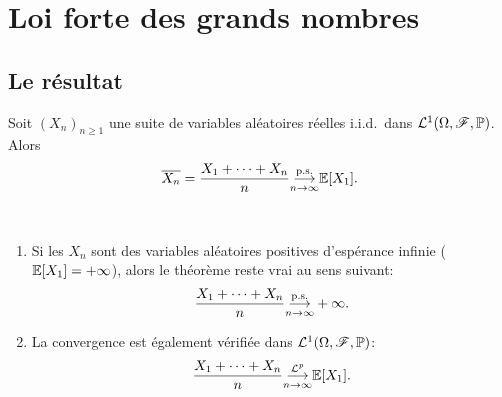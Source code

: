

\section{Loi forte des grands nombres} %

\subsection{Le résultat} %

\begin{theorem}
    Soit \({(X_n)}_{n\geq 1}\) une suite de variables aléatoires
    réelles i.i.d.\ dans \(\mathcal L^1(\Omega, \mathscr{F}, \mathbb{P})\).
    Alors
    \begin{equation*}
        \overline{X_n} = \frac{X_1 + \cdots + X_n}{n} \underset{n\to\infty}{{\overset{\text{p.s.}}{\longrightarrow}}} \mathbb{E}[X_1].
    \end{equation*}
\end{theorem}

\begin{remark}\,
    \begin{enumerate}
        \item Si les \(X_n\) sont des variables aléatoires
        positives d'espérance infinie (\(\mathbb{E}[X_1] = +\infty\)),
        alors le théorème reste vrai au sens suivant:
        \begin{equation*}
            \frac{X_1 + \cdots + X_n}{n} \underset{n\to\infty}{{\overset{\text{p.s.}}{\longrightarrow}}} +\infty.
        \end{equation*}

        \item La convergence est également vérifiée dans
        \(\mathcal L^1(\Omega, \mathscr{F}, \mathbb{P})\):
        \begin{equation*}
            \frac{X_1 + \cdots + X_n}{n} \underset{n\to\infty}{{\overset{\mathcal{L}^{p}}{\longrightarrow}}} \mathbb{E}[X_1].
        \end{equation*}
    \end{enumerate}
\end{remark}

